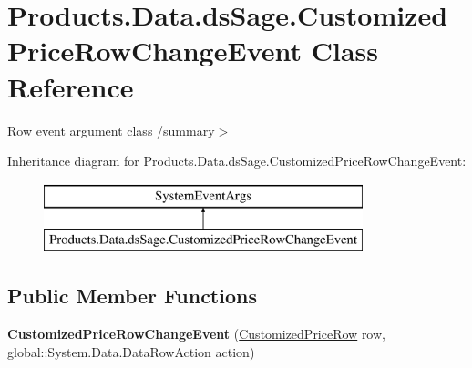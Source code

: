 \hypertarget{class_products_1_1_data_1_1ds_sage_1_1_customized_price_row_change_event}{}\section{Products.\+Data.\+ds\+Sage.\+Customized\+Price\+Row\+Change\+Event Class Reference}
\label{class_products_1_1_data_1_1ds_sage_1_1_customized_price_row_change_event}


Row event argument class /summary$>$  


Inheritance diagram for Products.\+Data.\+ds\+Sage.\+Customized\+Price\+Row\+Change\+Event\+:\begin{figure}[H]
\begin{center}
\leavevmode
\includegraphics[height=2.000000cm]{class_products_1_1_data_1_1ds_sage_1_1_customized_price_row_change_event}
\end{center}
\end{figure}
\subsection*{Public Member Functions}
\begin{DoxyCompactItemize}
\item 
{\bfseries Customized\+Price\+Row\+Change\+Event} (\hyperlink{class_products_1_1_data_1_1ds_sage_1_1_customized_price_row}{Customized\+Price\+Row} row, global\+::\+System.\+Data.\+Data\+Row\+Action action)\hypertarget{class_products_1_1_data_1_1ds_sage_1_1_customized_price_row_change_event_a7d27ef7bf1ab4f1b68992fe0bf3436cf}{}\label{class_products_1_1_data_1_1ds_sage_1_1_customized_price_row_change_event_a7d27ef7bf1ab4f1b68992fe0bf3436cf}

\end{DoxyCompactItemize}
